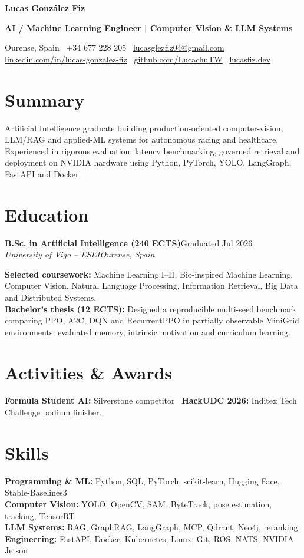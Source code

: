 \documentclass[10pt,a4paper]{article}
\newcommand{\entry}[4]{
  \textbf{#1}\hfill{\small #2}\\[-1pt]
  \textit{#3}\hfill{\small\textit{#4}}\par\vspace{-1.5pt}
}
\begin{document}
{\fontsize{26.5pt}{28pt}\selectfont\bfseries\color{ink} Lucas Gonz\'alez Fiz}\par
\vspace{1pt}
{\fontsize{12.5pt}{14pt}\selectfont\bfseries\color{accent} AI / Machine Learning Engineer | Computer Vision \& LLM Systems}\par
\vspace{3pt}
{\small
Ourense, Spain \textbar\ +34 677 228 205 \textbar\
\href{mailto:lucasglezfiz04@gmail.com}{lucasglezfiz04@gmail.com}\\[-1pt]
\href{https://linkedin.com/in/lucas-gonzalez-fiz}{linkedin.com/in/lucas-gonzalez-fiz} \textbar\
\href{https://github.com/LucachuTW}{github.com/LucachuTW} \textbar\
\href{https://lucasfiz.dev}{lucasfiz.dev}
}

\section{Summary}
Artificial Intelligence graduate building production-oriented computer-vision, LLM/RAG and applied-ML systems for autonomous racing and healthcare. Experienced in rigorous evaluation, latency benchmarking, governed retrieval and deployment on NVIDIA hardware using Python, PyTorch, YOLO, LangGraph, FastAPI and Docker.

\section{Education}
\entry{B.Sc. in Artificial Intelligence (240 ECTS)}{Graduated Jul 2026}{University of Vigo -- ESEI}{Ourense, Spain}
\textbf{Selected coursework:} Machine Learning I--II, Bio-inspired Machine Learning, Computer Vision, Natural Language Processing, Information Retrieval, Big Data and Distributed Systems.\\[-1pt]
\textbf{Bachelor's thesis (12 ECTS):} Designed a reproducible multi-seed benchmark comparing PPO, A2C, DQN and RecurrentPPO in partially observable MiniGrid environments; evaluated memory, intrinsic motivation and curriculum learning.\\[-1pt]
\section{Activities \& Awards}
\textbf{Formula Student AI:} Silverstone competitor \textbar\ \textbf{HackUDC 2026:} Inditex Tech Challenge podium finisher.

\section{Skills}
\textbf{Programming \& ML:} Python, SQL, PyTorch, scikit-learn, Hugging Face, Stable-Baselines3\\
\textbf{Computer Vision:} YOLO, OpenCV, SAM, ByteTrack, pose estimation, tracking, TensorRT\\
\textbf{LLM Systems:} RAG, GraphRAG, LangGraph, MCP, Qdrant, Neo4j, reranking\\
\textbf{Engineering:} FastAPI, Docker, Kubernetes, Linux, Git, ROS, NATS, NVIDIA Jetson
\end{document}
